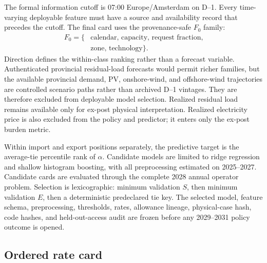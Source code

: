 \documentclass[10pt,journal]{IEEEtran}
\begin{document}
The formal information cutoff is 07:00 Europe/Amsterdam on D--1. Every time-varying deployable feature must have a source and availability record that precedes the cutoff. The final card uses the provenance-safe $F_0$ family:
\begin{equation}
\begin{aligned}
F_0=\{&\text{calendar, capacity, request fraction,}\\[-1mm]
&\text{zone, technology}\}.
\end{aligned}
\label{eq:F0}
\end{equation}
Direction defines the within-class ranking rather than a forecast variable. Authenticated provincial residual-load forecasts would permit richer families, but the available provincial demand, PV, onshore-wind, and offshore-wind trajectories are controlled scenario paths rather than archived D--1 vintages. They are therefore excluded from deployable model selection. Realized residual load remains available only for ex-post physical interpretation. Realized electricity price is also excluded from the policy and predictor; it enters only the ex-post burden metric.

Within import and export positions separately, the predictive target is the average-tie percentile rank of $\alpha$. Candidate models are limited to ridge regression and shallow histogram boosting, with all preprocessing estimated on 2025--2027. Candidate cards are evaluated through the complete 2028 annual operator problem. Selection is lexicographic: minimum validation $S$, then minimum validation $E$, then a deterministic predeclared tie key. The selected model, feature schema, preprocessing, thresholds, rates, allowance lineage, physical-case hash, code hashes, and held-out-access audit are frozen before any 2029--2031 policy outcome is opened.

\subsection{Ordered rate card}
\end{document}
